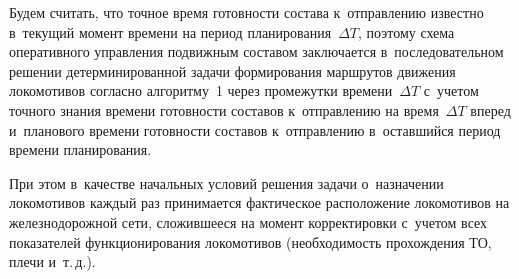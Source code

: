 \begin{multicols}{2}

Будем считать, что точное время готовности состава к~отправлению известно 
в~текущий момент времени на период планирования~$\Delta T$,
поэтому схема оперативного управления подвижным составом 
заключается в~последовательном решении детерминированной
задачи формирования маршрутов движения локомотивов согласно алгоритму~1 
через промежутки времени~$\Delta T$
с~учетом точного знания времени готовности составов к~отправлению на время~$\Delta T$ 
вперед и~планового времени го\-тов\-ности
составов к~отправлению в~оставшийся период времени планирования.
 
 При этом в~качестве начальных условий решения задачи о~назначении локомотивов 
каждый раз принимается
фактическое расположение локомотивов на железнодорожной сети, сложившееся на 
момент корректировки
с~учетом всех показателей функционирования локомотивов (необходимость прохождения ТО, 
плечи и~т.\,д.).

\begin{table*}\small %
\begin{center}
\vspace*{2ex}


\end{center}
\end{table*}
\end{multicols}
